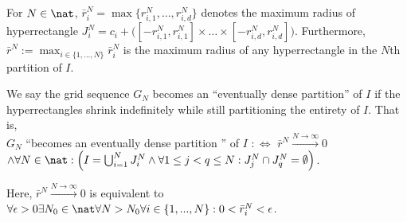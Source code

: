 For $N \in \nat$, $\bar r_i^N = \max\{ r_{i,1}^N,\ldots, r_{i,d}^N\}$ denotes the maximum radius of hyperrectangle $J_i^N = c_i + \bigl([-r_{i,1}^N ,r_{i,1}^N ]\times \ldots \times [-r_{i,d}^N ,r_{i,d}^N ] \bigr)$. Furthermore, $\bar r^N := \max_{i \in \{1,...,N\}} \bar r_i^N$ is the maximum radius of any hyperrectangle in the $N$th partition of $I$.


\begin{defn}
 We say the grid sequence $G_N$ becomes an ``eventually dense partition'' of $I$ if the hyperrectangles shrink indefinitely while still partitioning the entirety of $I$. That is, \\
 
$G_N$ ``becomes an eventually dense partition '' of $I$ $:\Longleftrightarrow$ 
$\bar r^N \stackrel{N \to \infty}{\longrightarrow} 0$ $ \wedge \forall N \in \nat: \Bigl(I = \bigcup_{i=1}^N J_i^N \wedge \forall 1\leq j< q \leq N : J_j^N \cap J_q^N = \emptyset\Bigr)$.

Here, $\bar r^N \stackrel{N \to \infty}{\longrightarrow} 0$ is equivalent to $\forall \epsilon >0 \exists N_0 \in \nat \forall N > N_0 \forall i \in \{1,...,N\}: 0< \bar r_i^N < \epsilon $.
\label{defn:eventuallydensepartition}
\end{defn}
%
%
%
%

